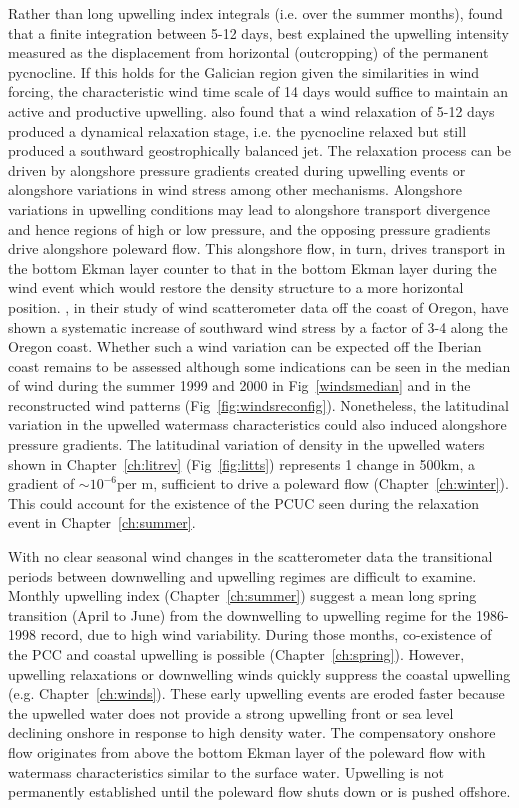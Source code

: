Rather than long upwelling index integrals (i.e. over the summer
months), \citet{Austin02} found that a finite integration between
5-12 days, best explained the upwelling intensity measured as the
displacement from horizontal (outcropping) of the permanent
pycnocline. If this holds for the Galician region given the
similarities in wind forcing, the characteristic wind time scale
of 14 days would suffice to maintain an active and productive
upwelling. \citet{Austin02} also found that a wind relaxation of
5-12 days produced a dynamical relaxation stage, i.e. the
pycnocline relaxed but still produced a southward geostrophically
balanced jet. The relaxation process can be driven by alongshore
pressure gradients created during upwelling events \citep{Send87}
or alongshore variations in wind stress \citep{McCreary87} among
other mechanisms. Alongshore variations in upwelling conditions
may lead to alongshore transport divergence and hence regions of
high or low pressure, and the opposing pressure gradients drive
alongshore poleward flow. This alongshore flow, in turn, drives
transport in the bottom Ekman layer counter to that in the bottom
Ekman layer during the wind event which would restore the density
structure to a more horizontal position. \citet{Samelson02}, in
their study of wind scatterometer data off the coast of Oregon,
have shown a systematic increase of southward wind stress by a
factor of 3-4 along the Oregon coast. Whether such a wind
variation can be expected off the Iberian coast remains to be
assessed although some indications can be seen in the median of
wind during the summer 1999 and 2000 in Fig~\ref{windsmedian} and
in the reconstructed wind patterns (Fig~\ref{fig:windsreconfig}).
Nonetheless, the latitudinal variation in the upwelled watermass
characteristics could also induced alongshore pressure gradients.
The latitudinal variation of density in the upwelled waters shown
in Chapter~\ref{ch:litrev} (Fig~\ref{fig:litts}) represents 1\dens
change in 500km, a gradient of $\sim 10^{-6}$\dens per m,
sufficient to drive a poleward flow (Chapter~\ref{ch:winter}).
This could account for the existence of the PCUC seen during the
relaxation event in Chapter~\ref{ch:summer}.

With no clear seasonal wind changes in the scatterometer data the
transitional periods between downwelling and upwelling regimes are
difficult to examine. Monthly upwelling index
(Chapter~\ref{ch:summer}) suggest a mean long spring transition
(April to June) from the downwelling to upwelling regime for the
1986-1998 record, due to high wind variability. During those
months, co-existence of the PCC and coastal upwelling is possible
(Chapter~\ref{ch:spring}). However, upwelling relaxations or
downwelling winds quickly suppress the coastal upwelling (e.g.
Chapter~\ref{ch:winds}). These early upwelling events are eroded
faster because the upwelled water does not provide a strong
upwelling front or sea level declining onshore in response to high
density water. The compensatory onshore flow originates from above
the bottom Ekman layer of the poleward flow with watermass
characteristics similar to the surface water. Upwelling is not
permanently established until the poleward flow shuts down or is
pushed offshore.

